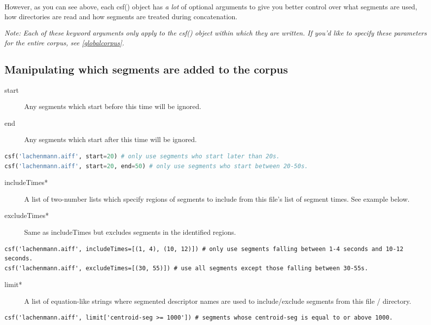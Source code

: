 \documentclass{article}
\begin{document}
\begin{spacing}{1.2}
\noindent However, as you can see above, each csf() object has \emph{a lot} of optional arguments to give you better control over what segments are used, how directories are read and how segments are treated during concatenation.  

\emph{Note: Each of these keyword arguments \emph{only} apply to the csf() object within which they are written.  If you'd like to specify these parameters for the entire corpus, see \ref{globalcorpus}.}

\subsection{Manipulating which segments are added to the corpus}
\begin{description}
\item[start] Any segments which start before this time will be ignored.
\item[end] Any segments which start after this time will be ignored.
\end{description}

\begin{lstlisting}[language=python]
csf('lachenmann.aiff', start=20) # only use segments who start later than 20s.
csf('lachenmann.aiff', start=20, end=50) # only use segments who start between 20-50s.
\end{lstlisting}

\begin{description}
\item[includeTimes*] A list of two-number lists which specify regions of segments to include from this file's list of segment times.  See example below.
\item[excludeTimes*] Same as includeTimes but excludes segments in the identified regions.
\end{description}

\begin{lstlisting}
csf('lachenmann.aiff', includeTimes=[(1, 4), (10, 12)]) # only use segments falling between 1-4 seconds and 10-12 seconds.
csf('lachenmann.aiff', excludeTimes=[(30, 55)]) # use all segments except those falling between 30-55s.
\end{lstlisting}

\begin{description}
\item[limit*] A list of equation-like strings where segmented descriptor names are used to include/exclude segments from this file / directory.
\end{description}
\begin{lstlisting}
csf('lachenmann.aiff', limit['centroid-seg >= 1000']) # segments whose centroid-seg is equal to or above 1000.


\end{lstlisting}
\end{spacing}
\end{document}
